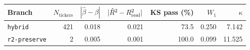 \begin{tabular}{lrrrrrr}
\toprule
Branch & $N_{\mathrm{tickers}}$ & $|\hat\beta-\beta|$ & $|\hat R^2 - R^2_{\mathrm{real}}|$ & KS pass (\%) & $W_1$ & $\kappa$ \\
\midrule
\texttt{hybrid} & 421 & 0.018 & 0.021 & 73.5 & 0.250 & 7.142 \\
\texttt{r2-preserve} & 2 & 0.005 & 0.001 & 100.0 & 0.099 & 11.525 \\
\bottomrule
\end{tabular}
